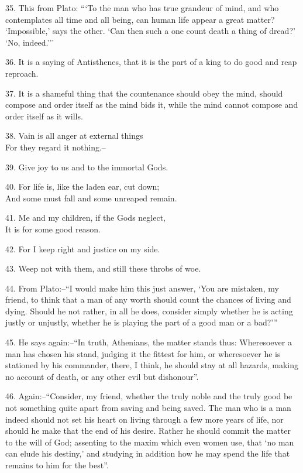 \documentclass{book}
\begin{document}
35. This from Plato: ```To the man who has true grandeur of mind, and
who contemplates all time and all being, can human life appear a great
matter? `Impossible,' says the other. `Can then such a one count death
a thing of dread?' `No, indeed.'''

36. It is a saying of Antisthenes, that it is the part of a king to do
good and reap reproach.

37. It is a shameful thing that the countenance should obey the mind,
should compose and order itself as the mind bids it, while the mind
cannot compose and order itself as it wills.

38. Vain is all anger at external things \\
    For they regard it nothing.--

39. Give joy to us and to the immortal Gods.

40. For life is, like the laden ear, cut down; \\
    And some must fall and some unreaped remain.

41. Me and my children, if the Gods neglect, \\
    It is for some good reason.

42. For I keep right and justice on my side.

43. Weep not with them, and still these throbs of woe.

44. From Plato:--``I would make him this just answer, `You are
mistaken, my friend, to think that a man of any worth should count the
chances of living and dying. Should he not rather, in all he does,
consider simply whether he is acting justly or unjustly, whether he is
playing the part of a good man or a bad?'''

45. He says again:--``In truth, Athenians, the matter stands thus:
Wheresoever a man has chosen his stand, judging it the fittest for
him, or wheresoever he is stationed by his commander, there, I think,
he should stay at all hazards, making no account of death, or any
other evil but dishonour''.

46. Again:--``Consider, my friend, whether the truly noble and the
truly good be not something quite apart from saving and being
saved. The man who is a man indeed should not set his heart on living
through a few more years of life, nor should he make that the end of
his desire. Rather he should commit the matter to the will of God;
assenting to the maxim which even women use, that `no man can elude
his destiny,' and studying in addition how he may spend the life that
remains to him for the best''.
\end{document}
